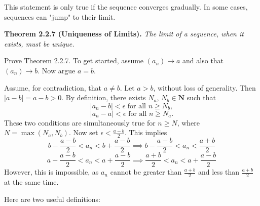 \begin{solution}
  This statement is only true if the sequence converges gradually. In some cases, sequences can "jump" to their limit.
\end{solution}

\begin{exercise}
  \textbf{Theorem 2.2.7 (Uniqueness of Limits).} \textit{The limit of a sequence, when it exists, must be unique.}

  Prove Theorem 2.2.7. To get started, assume $\left(a_{n}\right) \rightarrow a$ and also that $\left(a_{n}\right) \rightarrow b$. Now argue $a=b$.
\end{exercise}

\begin{solution}
  Assume, for contradiction, that $a\neq b$. Let $a > b$, without loss of generality. Then $|a-b|=a-b>0$. By definition, there exists $N_a$, $N_b\in\mathbf{N}$ such that $$|a_n-b|<\epsilon \text{ for all } n\geq N_b,$$ $$|a_n-a|<\epsilon \text{ for all } n\geq N_a.$$ These two conditions are simultaneously true for $n\geq N$, where $N=\max(N_a, N_b) $. Now set $\epsilon<\frac{a-b}{2}$. This implies $$b-\frac{a-b}{2}<a_n<b+\frac{a-b}{2}\implies b-\frac{a-b}{2}<a_n<\frac{a+b}{2}$$ $$a-\frac{a-b}{2}<a_n<a+\frac{a-b}{2}\implies \frac{a+b}{2}<a_n<a+\frac{a-b}{2}$$ However, this is impossible, as $a_n$ cannot be greater than $\frac{a+b}{2}$ and less than $\frac{a+b}{2}$ at the same time.
\end{solution}

\begin{exercise}
  Here are two useful definitions:
\end{exercise}

